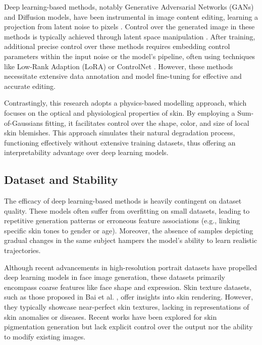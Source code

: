 \begin{spacing}{1.5}
Deep learning-based methods, notably Generative Adversarial Networks (GANs) and Diffusion models, have been instrumental in image content editing, learning a projection from latent noise to pixels \cite{goodfellowGenerativeAdversarialNetworks2014,DBLP:conf/nips/HoJA20,DBLP:journals/corr/KingmaW13}. Control over the generated image in these methods is typically achieved through latent space manipulation \cite{DBLP:journals/corr/abs-1812-04948, DBLP:journals/corr/abs-1907-10786}. After training, additional precise control over these methods requires embedding control parameters within the input noise or the model's pipeline, often using techniques like Low-Rank Adaption (LoRA) \cite{2021arXiv210609685H} or ControlNet \cite{2023arXiv230205543Z}. However, these methods necessitate extensive data annotation and model fine-tuning for effective and accurate editing.

Contrastingly, this research adopts a physics-based modelling approach, which focuses on the optical and physiological properties of skin. By employing a Sum-of-Gaussians fitting, it facilitates control over the shape, color, and size of local skin blemishes. This approach simulates their natural degradation process, functioning effectively without extensive training datasets, thus offering an interpretability advantage over deep learning models.

\subsection{Dataset and Stability}

The efficacy of deep learning-based methods is heavily contingent on dataset quality. These models often suffer from overfitting on small datasets, leading to repetitive generation patterns or erroneous feature associations (e.g., linking specific skin tones to gender or age). Moreover, the absence of samples depicting gradual changes in the same subject hampers the model's ability to learn realistic trajectories.

Although recent advancements in high-resolution portrait datasets \cite{DBLP:journals/corr/abs-1812-04948} have propelled deep learning models in face image generation, these datasets primarily encompass coarse features like face shape and expression. Skin texture datasets, such as those proposed in Bai et al. \cite{Bai_2023_CVPR}, offer insights into skin rendering. However, they typically showcase near-perfect skin textures, lacking in representations of skin anomalies or diseases. Recent works have been explored for skin pigmentation generation\cite{beharaSkinLesionSynthesis2023} but lack explicit control over the output nor the ability to modify existing images.


\end{spacing}
